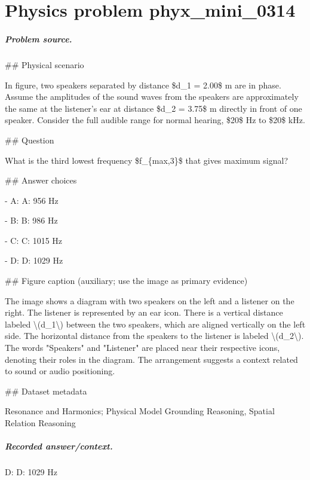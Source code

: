 
\chapter{Physics problem phyx\_mini\_0314}
\label{ch:PhyXMiniProblems_problem_phyx_mini_0314}

\paragraph{Problem source.}
\#\# Physical scenario

In figure, two speakers separated by distance \$d\_1 = 2.00\$ m are in phase. Assume the amplitudes of the sound waves from the speakers are approximately the same at the listener's ear at distance \$d\_2 = 3.75\$ m directly in front of one speaker. Consider the full audible range for normal hearing, \$20\$ Hz to \$20\$ kHz.

\#\# Question

What is the third lowest frequency \$f\_\{max,3\}\$ that gives maximum signal?

\#\# Answer choices

- A: A: 956 Hz

- B: B: 986 Hz

- C: C: 1015 Hz

- D: D: 1029 Hz

\#\# Figure caption (auxiliary; use the image as primary evidence)

The image shows a diagram with two speakers on the left and a listener on the right. The listener is represented by an ear icon. There is a vertical distance labeled \textbackslash{}(d\_1\textbackslash{}) between the two speakers, which are aligned vertically on the left side. The horizontal distance from the speakers to the listener is labeled \textbackslash{}(d\_2\textbackslash{}). The words "Speakers" and "Listener" are placed near their respective icons, denoting their roles in the diagram. The arrangement suggests a context related to sound or audio positioning.

\#\# Dataset metadata

Resonance and Harmonics; Physical Model Grounding Reasoning, Spatial Relation Reasoning

\paragraph{Recorded answer/context.}
D: D: 1029 Hz

